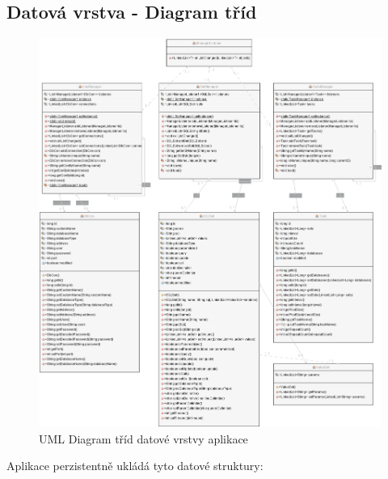 \documentclass[czech,bachelor,public,dept460,male,cpdeclaration,twoside]{diploma}
\begin{document}
\subsection{Datová vrstva - Diagram tříd} \label{datadiagram}
\begin{figure}[!htbp]\centering\includegraphics[width=1.0\textwidth]{Figures/DataLayerDiagram.png}\caption{UML Diagram tříd datové vrstvy aplikace}
\end{figure}
\newpage
Aplikace perzistentně ukládá tyto datové struktury:
\end{document}
